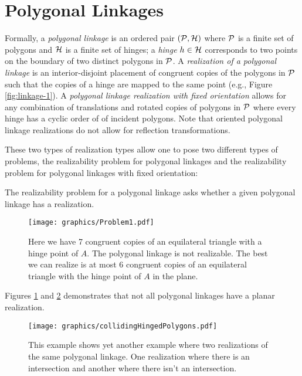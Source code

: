 \section{Polygonal Linkages}

Formally, a \textit{polygonal linkage} is an ordered pair $\left({\cal P},{\cal H}
\right)$ where ${\cal P}$ is a finite set of polygons and ${\cal H}$ is a finite set of hinges; a 
\textit{hinge} $h\in {\cal H}$ 
corresponds to two points on the boundary of two distinct polygons in ${\cal P}$.  A \emph{realization 
of a polygonal linkage} is an interior-disjoint placement of 
congruent copies of the polygons in ${\cal P}$ such that the copies of a hinge are mapped to the same point (e.g., Figure \ref{fig:linkage-1}).  A \textit{polygonal linkage realization with fixed orientation} allows for any combination of translations and rotated copies of polygons in ${\cal P}$ where every hinge has a cyclic order of  of incident polygons.  Note that oriented polygonal linkage realizations do not allow for reflection transformations.  

These two types of realization types allow one to pose two different types of problems, the realizability problem for polygonal linkages and the realizability problem for polygonal linkages with fixed orientation:
\begin{prob}\label{problem:UnorderedPolygonal}
The realizability problem for a polygonal linkage asks whether a given polygonal linkage has 
a realization.
\end{prob}
\begin{figure}[!htbp]
\begin{center}
\texttt{[image: graphics/Problem1.pdf]}
\end{center} 
\caption{Here we have 7 congruent copies of an equilateral triangle with a hinge point of $A$.  The polygonal linkage is not realizable.  The best we can realize is at most 6 congruent copies of an equilateral triangle with the hinge point of $A$ in the plane.}
\label{fig:problem1}
\end{figure}


Figures \ref{fig:problem1} and \ref{fig:collidingHingedPolygons} demonstrates that not all polygonal linkages have a planar realization.  
\begin{figure}[!htbp]\label{fig:collidingHingedPolygons}
\begin{center}
\texttt{[image: graphics/collidingHingedPolygons.pdf]}
\end{center} 
\caption{This example shows yet another example where two realizations of the same polygonal linkage.  One realization where there is an intersection and another where there isn't an intersection.}
\end{figure}

